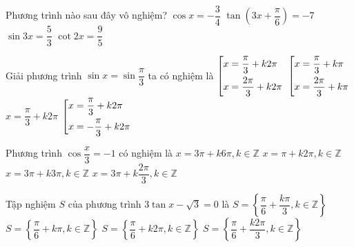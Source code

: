 \begin{ex}%
	Phương trình nào sau đây vô nghiệm? 
	\choice
	{$\cos x=-\dfrac{3}{4}$}
	{$\tan \left(3x+\dfrac{\pi}{6}\right)=-7$}
	{\True $\sin 3x=\dfrac{5}{3}$}
	{$\cot 2x=\dfrac{9}{5}$}
\end{ex}

\begin{ex}%
	Giải phương trình $ \sin x =\sin \dfrac{\pi}{3} $ ta có nghiệm là
	\choice
	{\True 	$\left[\begin{aligned}
			& x=\dfrac{\pi}{3}+k2\pi
			 \\
			&x=\dfrac{2\pi}{3}+k2\pi \end{aligned}\right.$}
	{	$\left[\begin{aligned}
			& x=\dfrac{\pi}{3}+k\pi
			\\
			&x=\dfrac{2\pi}{3}+k\pi \end{aligned}\right.$}
	{$x=\dfrac{\pi}{3}+k2\pi$}
	{$\left[\begin{aligned}
			& x=\dfrac{\pi}{3}+k2\pi
			\\
			&x=-\dfrac{\pi}{3}+k2\pi \end{aligned}\right.$}
\end{ex}

\begin{ex}%
		Phương trình $ \cos \dfrac{x}{3} =-1 $ có nghiệm là
		\choice
		{\True $x=3\pi+k6\pi,k\in\mathbb{Z}$}
		{$x=\pi+k2\pi,k\in\mathbb{Z}$}
		{$x=3\pi+k3\pi,k\in\mathbb{Z}$}
		{$x=3\pi+k\dfrac{2\pi}{3},k\in\mathbb{Z}$}
	\end{ex}

\begin{ex}%
		Tập nghiệm $S$ của phương trình $3\tan x-\sqrt{3}=0$ là
		\choice
		{$S=\left\{\dfrac{\pi}{6}+\dfrac{k\pi}{3},k\in \mathbb{Z}\right\}$}
		{\True $S=\left\{\dfrac{\pi}{6}+k\pi,k\in \mathbb{Z}\right\}$}
		{$S=\left\{\dfrac{\pi}{6}+k2\pi,k\in \mathbb{Z}\right\}$}
		{$S=\left\{\dfrac{\pi}{6}+\dfrac{k2\pi}{3},k\in \mathbb{Z}\right\}$}
	\end{ex}

